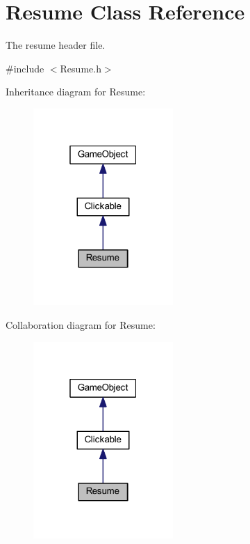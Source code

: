 \hypertarget{class_resume}{\section{Resume Class Reference}
\label{class_resume}
}


The resume header file.  




{\ttfamily \#include $<$Resume.\+h$>$}



Inheritance diagram for Resume\+:\nopagebreak
\begin{figure}[H]
\begin{center}
\leavevmode
\includegraphics[width=151pt]{class_resume__inherit__graph}
\end{center}
\end{figure}


Collaboration diagram for Resume\+:\nopagebreak
\begin{figure}[H]
\begin{center}
\leavevmode
\includegraphics[width=151pt]{class_resume__coll__graph}
\end{center}
\end{figure}
